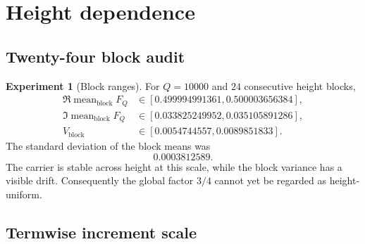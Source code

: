 \documentclass[11pt]{amsart}
\numberwithin{equation}{section}
\theoremstyle{plain}
\theoremstyle{definition}
\newtheorem{experiment}[theorem]{Experiment}
\theoremstyle{remark}
\newcommand{\1}{\mathbf{1}}
\begin{document}
\section{Height dependence}
\label{sec:numerical_height_dependence}

\subsection{Twenty-four block audit}
\label{subsec:numerical_block_audit}

\begin{experiment}[Block ranges]
\label{exp:numerical_block_ranges}
For $Q=10000$ and $24$ consecutive height blocks,
\begin{align}
\Re\operatorname{mean}_{\mathrm{block}}F_Q
&\in[0.499994991361,0.500003656384],
\label{eq:numerical_block_real_range_detailed}
\\
\Im\operatorname{mean}_{\mathrm{block}}F_Q
&\in[0.033825249952,0.035105891286],
\label{eq:numerical_block_imag_range_detailed}
\\
V_{\mathrm{block}}
&\in[0.0054744557,0.0089851833].
\label{eq:numerical_block_var_range_detailed}
\end{align}
The standard deviation of the block means was
\begin{equation}
0.0003812589.
\label{eq:numerical_block_mean_std}
\end{equation}
The carrier is stable across height at this scale, while the block variance
has a visible drift.  Consequently the global factor $3/4$ cannot yet be
regarded as height-uniform.
\end{experiment}

\subsection{Termwise increment scale}
\label{subsec:numerical_increment_scale}
\end{document}
